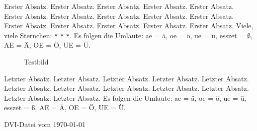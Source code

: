 \documentclass[a4paper]{pretty}%
\begin{document}
%
%
%
Erster Absatz. Erster Absatz. Erster Absatz. Erster Absatz. Erster Absatz.
Erster Absatz. Erster Absatz. Erster Absatz. Erster Absatz. Erster Absatz.
Erster Absatz. Erster Absatz. Erster Absatz. Erster Absatz. Erster Absatz.
Viele, viele Sternchen: \verb|*| \verb|*| \verb|*|.
Es folgen die Umlaute: ae = \"{a}, oe = \"{o}, ue = \"{u}, esszet = \ss{},
AE = \"{A}, OE = \"{O}, UE = \"{U}.
%
\begin{figure}[h]%
\def\class#1{{\tt#1}}
%
\caption{Testbild {\tt\rglq{}\loadiagram\rgrq{}}}%
\end{figure}%
%
\par Letzter Absatz. Letzter Absatz. Letzter Absatz. Letzter Absatz. 
Letzter Absatz. Letzter Absatz. Letzter Absatz. Letzter Absatz. 
Letzter Absatz. Letzter Absatz. Letzter Absatz. Letzter Absatz. 
Es folgen die Umlaute: ae = \"{a}, oe = \"{o}, ue = \"{u}, esszet = \ss{},
AE = \"{A}, OE = \"{O}, UE = \"{U}.
%
\par DVI-Datei vom \today
%
\end{document}
